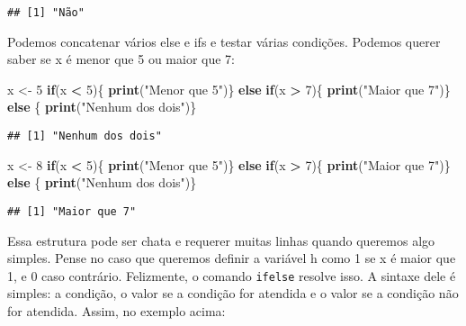 \documentclass[
]{book}
\newenvironment{Shaded}{\begin{snugshade}}{\end{snugshade}}
\newcommand{\ControlFlowTok}[1]{\textcolor[rgb]{0.13,0.29,0.53}{\textbf{#1}}}
\newcommand{\DecValTok}[1]{\textcolor[rgb]{0.00,0.00,0.81}{#1}}
\newcommand{\KeywordTok}[1]{\textcolor[rgb]{0.13,0.29,0.53}{\textbf{#1}}}
\newcommand{\NormalTok}[1]{#1}
\newcommand{\OperatorTok}[1]{\textcolor[rgb]{0.81,0.36,0.00}{\textbf{#1}}}
\newcommand{\StringTok}[1]{\textcolor[rgb]{0.31,0.60,0.02}{#1}}
\begin{document}
\begin{verbatim}
## [1] "Não"
\end{verbatim}

Podemos concatenar vários else e ifs e testar várias condições. Podemos querer saber se x é menor que 5 ou maior que 7:

\begin{Shaded}
\begin{Highlighting}[]
\NormalTok{x \textless{}{-}}\StringTok{ }\DecValTok{5}
\ControlFlowTok{if}\NormalTok{(x }\OperatorTok{\textless{}}\StringTok{ }\DecValTok{5}\NormalTok{)\{}
    \KeywordTok{print}\NormalTok{(}\StringTok{"Menor que 5"}\NormalTok{)\} }\ControlFlowTok{else} \ControlFlowTok{if}\NormalTok{(x }\OperatorTok{\textgreater{}}\StringTok{ }\DecValTok{7}\NormalTok{)\{}
    \KeywordTok{print}\NormalTok{(}\StringTok{"Maior que 7"}\NormalTok{)\} }\ControlFlowTok{else}\NormalTok{ \{}
    \KeywordTok{print}\NormalTok{(}\StringTok{"Nenhum dos dois"}\NormalTok{)\}}
\end{Highlighting}
\end{Shaded}

\begin{verbatim}
## [1] "Nenhum dos dois"
\end{verbatim}

\begin{Shaded}
\begin{Highlighting}[]
\NormalTok{x \textless{}{-}}\StringTok{ }\DecValTok{8}
\ControlFlowTok{if}\NormalTok{(x }\OperatorTok{\textless{}}\StringTok{ }\DecValTok{5}\NormalTok{)\{}
    \KeywordTok{print}\NormalTok{(}\StringTok{"Menor que 5"}\NormalTok{)\} }\ControlFlowTok{else} \ControlFlowTok{if}\NormalTok{(x }\OperatorTok{\textgreater{}}\StringTok{ }\DecValTok{7}\NormalTok{)\{}
    \KeywordTok{print}\NormalTok{(}\StringTok{"Maior que 7"}\NormalTok{)\} }\ControlFlowTok{else}\NormalTok{ \{}
    \KeywordTok{print}\NormalTok{(}\StringTok{"Nenhum dos dois"}\NormalTok{)\}}
\end{Highlighting}
\end{Shaded}

\begin{verbatim}
## [1] "Maior que 7"
\end{verbatim}

Essa estrutura pode ser chata e requerer muitas linhas quando queremos algo simples. Pense no caso que queremos definir a variável h como 1 se x é maior que 1, e 0 caso contrário. Felizmente, o comando \texttt{ifelse} resolve isso. A sintaxe dele é simples: a condição, o valor se a condição for atendida e o valor se a condição não for atendida. Assim, no exemplo acima:
\end{document}
